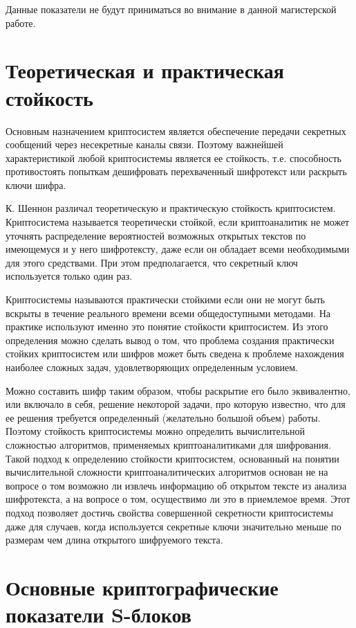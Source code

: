 Данные показатели не будут приниматься во внимание в данной магистерской
работе.

\section{Теоретическая и практическая стойкость}

Основным назначением криптосистем является обеспечение передачи секретных
сообщений через несекретные каналы связи. Поэтому важнейшей характеристикой
любой криптосистемы является ее стойкость, т.е. способность противостоять
попыткам дешифровать перехваченный шифротекст или раскрыть ключи шифра.

К. Шеннон различал теоретическую и практическую стойкость криптосистем.
Криптосистема называется теоретически стойкой, если криптоаналитик не может
уточнять распределение вероятностей возможных открытых текстов по имеющемуся и у
него шифротексту, даже если он обладает всеми необходимыми для этого средствами.
При этом предполагается, что секретный ключ используется только один раз.

Криптосистемы называются практически стойкими если они не могут быть вскрыты в
течение реального времени всеми общедоступными методами. На практике используют
именно это понятие стойкости криптосистем. Из этого определения можно сделать
вывод о том, что проблема создания практически стойких криптосистем или шифров
может быть сведена к проблеме нахождения наиболее сложных задач, удовлетворяющих
определенным условием.

Можно составить шифр таким образом, чтобы раскрытие его было эквивалентно, или
включало в себя, решение некоторой задачи, про которую известно, что для ее
решения требуется определенный (желательно большой объем) работы. Поэтому
стойкость криптосистемы можно определить вычислительной сложностью алгоритмов,
применяемых криптоаналитиками для шифрования. Такой подход к определению
стойкости криптосистем, основанный на понятии вычислительной сложности
криптоаналитических алгоритмов основан не на вопросе о том возможно ли извлечь
информацию об открытом тексте из анализа шифротекста, а на вопросе о том,
осуществимо ли это в приемлемое время. Этот подход позволяет достичь свойства
совершенной секретности криптосистемы даже для случаев, когда используется
секретные ключи значительно меньше по размерам чем длина открытого шифруемого
текста.

\section{Основные криптографические показатели S-блоков}


